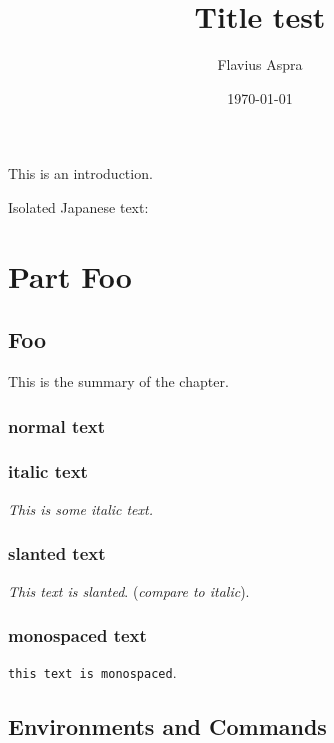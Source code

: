 \documentclass[a4paper,12pt,fleqn,twoside,openright,titlepagestyle=phpro]{yapbook}
\title{Title test}
\author{Flavius Aspra}
\date{\today}
\begin{document}
\frontmatter

    \maketitle

    \tableofcontents


        This is an introduction.

        Isolated Japanese text: 

\mainmatter

    \part{Part Foo}

        \chapter{Foo}
            \begin{chapsummary}
            This is the summary
            of the chapter.

            \lipsum[1]

            \end{chapsummary}

            \lipsum[1]

            \section{normal text}

            \section{italic text}
            \textit{This is some italic text.}

            \section{slanted text}
            \textsl{This text is slanted}. (\textit{compare to italic}).

            \section{monospaced text}
            \texttt{this text is monospaced}.

        \chapter{Environments and Commands}
\end{document}
